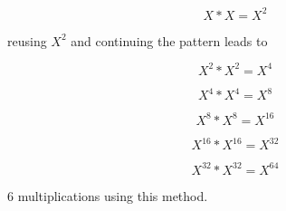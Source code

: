 \documentclass[journal]{IEEEtran}
\begin{document}
\begin{equation}
	X*X = X^2
\end{equation}

reusing $X^2$ and continuing the pattern leads to 

\begin{equation}
	X^2*X^2 = X^4
\end{equation}

\begin{equation}
	X^4*X^4 = X^8
\end{equation}

\begin{equation}
	X^8*X^8 = X^{16}
\end{equation}

\begin{equation}
	X^{16}*X^{16} = X^{32}
\end{equation}

\begin{equation}
	X^{32}*X^{32} = X^{64}
\end{equation}

6 multiplications using this method.
\end{document}
